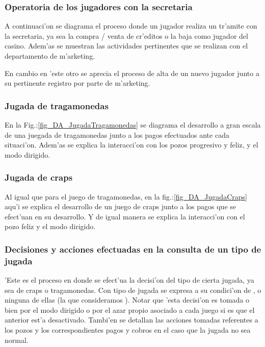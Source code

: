 \subsubsection{Operatoria de los jugadores con la secretaria}
A continuaci'on se diagrama el proceso donde un jugador realiza un tr'amite con la secretaria, ya sea la compra / venta de cr'editos o la baja como jugador del casino. Adem'as se muestran las actividades pertinentes que se realizan con el departamento de m'arketing. 


\clearpage

En cambio en 'este otro se aprecia el proceso de alta de un nuevo jugador junto a su pertinente registro por parte de m'arketing.



\clearpage




\subsubsection{Jugada de tragamonedas}
En la Fig.:\ref{fig_DA_JugadaTragamonedas} se diagrama el desarrollo a gran escala de una juegada de tragamonedas junto a los pagos efectuados ante cada situaci'on. Adem'as se explica la interacci'on con los pozos progresivo y feliz, y el modo dirigido.
% 

\clearpage





\subsubsection{Jugada de craps}
Al igual que para el juego de tragamonedas, en la fig.:\ref{fig_DA_JugadaCraps} aqu'i se explica el desarrollo de un juego de craps junto a los pagos que se efect'uan en su desarrollo. Y de igual manera se explica la interacci'on con el pozo feliz y el modo dirigido.


\clearpage





\subsubsection{Decisiones y acciones efectuadas en la consulta de un tipo de jugada}
'Este es el proceso en donde se efect'ua la decisi'on del tipo de cierta jugada, ya sea de craps o tragamonedas. Con tipo de jugada se expresa a su condici'on de ,  o ninguna de ellas (la que consideramos ). Notar que 'esta decisi'on es tomada o bien por el modo dirigido o por el azar propio asociado a cada juego si es que el anterior est'a desactivado. Tambi'en se detallan las acciones tomadas referentes a los pozos y los correspondientes pagos y cobros en el caso que la jugada no sea normal.





